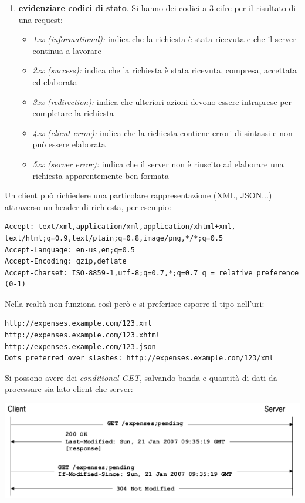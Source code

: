 \documentclass[a4paper,12pt, oneside]{book}
\begin{document}
\begin{enumerate}
\item \textbf{evidenziare codici di stato}. Si hanno dei codici a 3 cifre per il risultato di una request:
  \begin{itemize}
  \item \textit{1xx (informational):} indica che la richiesta è stata ricevuta e che il server continua a lavorare
  \item \textit{2xx (success):} indica che la richiesta è stata ricevuta, compresa, accettata ed elaborata
  \item \textit{3xx (redirection):} indica che ulteriori azioni devono essere intraprese per completare la richiesta
  \item \textit{4xx (client error):} indica che la richiesta contiene errori di sintassi e non può essere elaborata
  \item \textit{5xx (server error):} indica che il server non è riuscito ad elaborare una richiesta apparentemente ben formata
  \end{itemize}
\end{enumerate}
Un client può richiedere una particolare rappresentazione (XML, JSON...) attraverso un header di richiesta, per esempio:
\begin{verbatim}
Accept: text/xml,application/xml,application/xhtml+xml,
text/html;q=0.9,text/plain;q=0.8,image/png,*/*;q=0.5
Accept-Language: en-us,en;q=0.5
Accept-Encoding: gzip,deflate
Accept-Charset: ISO-8859-1,utf-8;q=0.7,*;q=0.7 q = relative preference (0-1)
\end{verbatim}
Nella realtà non funziona così però e si preferisce esporre il tipo nell'uri:
\begin{verbatim}
http://expenses.example.com/123.xml
http://expenses.example.com/123.xhtml
http://expenses.example.com/123.json
Dots preferred over slashes: http://expenses.example.com/123/xml
\end{verbatim}
Si possono avere dei \textit{conditional GET}, salvando banda e quantità di dati da processare sia lato client che server:
\begin{center}
\includegraphics[scale=0.7]{img/condget.png}
\end{center}
\end{document}
